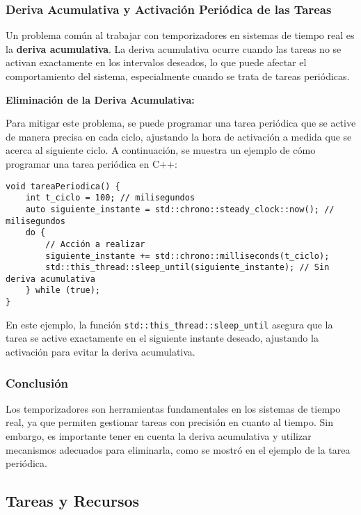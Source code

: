 \documentclass[a4paper,12pt]{article}
\begin{document}
\subsubsection{Deriva Acumulativa y Activación Periódica de las Tareas}

Un problema común al trabajar con temporizadores en sistemas de tiempo real es la \textbf{deriva acumulativa}. La deriva acumulativa ocurre cuando las tareas no se activan exactamente en los intervalos deseados, lo que puede afectar el comportamiento del sistema, especialmente cuando se trata de tareas periódicas.

\textbf{Eliminación de la Deriva Acumulativa:}

Para mitigar este problema, se puede programar una tarea periódica que se active de manera precisa en cada ciclo, ajustando la hora de activación a medida que se acerca al siguiente ciclo. A continuación, se muestra un ejemplo de cómo programar una tarea periódica en C++:

\begin{lstlisting}[style=customcpp]
void tareaPeriodica() {
    int t_ciclo = 100; // milisegundos
    auto siguiente_instante = std::chrono::steady_clock::now(); // milisegundos
    do {
        // Acción a realizar
        siguiente_instante += std::chrono::milliseconds(t_ciclo);
        std::this_thread::sleep_until(siguiente_instante); // Sin deriva acumulativa
    } while (true);
}
\end{lstlisting}

En este ejemplo, la función \texttt{std::this\_thread::sleep\_until} asegura que la tarea se active exactamente en el siguiente instante deseado, ajustando la activación para evitar la deriva acumulativa.

\subsubsection{Conclusión}

Los temporizadores son herramientas fundamentales en los sistemas de tiempo real, ya que permiten gestionar tareas con precisión en cuanto al tiempo. Sin embargo, es importante tener en cuenta la deriva acumulativa y utilizar mecanismos adecuados para eliminarla, como se mostró en el ejemplo de la tarea periódica. 


\subsection{Tareas y Recursos}
\end{document}
